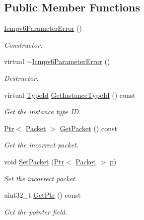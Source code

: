 \subsection*{Public Member Functions}
\begin{DoxyCompactItemize}
\item 
\hyperlink{classns3_1_1Icmpv6ParameterError_acbcfb8ebf705eacc9cbd42bb52dd5c7b}{Icmpv6\+Parameter\+Error} ()
\begin{DoxyCompactList}\small\item\em Constructor. \end{DoxyCompactList}\item 
virtual \hyperlink{classns3_1_1Icmpv6ParameterError_a1a0421a88c9bdf983b4afca69d2f8c9d}{$\sim$\+Icmpv6\+Parameter\+Error} ()
\begin{DoxyCompactList}\small\item\em Destructor. \end{DoxyCompactList}\item 
virtual \hyperlink{classns3_1_1TypeId}{Type\+Id} \hyperlink{classns3_1_1Icmpv6ParameterError_acadc137a5d91d25230ea720481fa442f}{Get\+Instance\+Type\+Id} () const 
\begin{DoxyCompactList}\small\item\em Get the instance type ID. \end{DoxyCompactList}\item 
\hyperlink{classns3_1_1Ptr}{Ptr}$<$ \hyperlink{classns3_1_1Packet}{Packet} $>$ \hyperlink{classns3_1_1Icmpv6ParameterError_af28874993c8eeb684f9987b4d58a7342}{Get\+Packet} () const 
\begin{DoxyCompactList}\small\item\em Get the incorrect packet. \end{DoxyCompactList}\item 
void \hyperlink{classns3_1_1Icmpv6ParameterError_a241ecd7ce904684d5be3f6a60ce4bbde}{Set\+Packet} (\hyperlink{classns3_1_1Ptr}{Ptr}$<$ \hyperlink{classns3_1_1Packet}{Packet} $>$ \hyperlink{lte__link__budget__x2__handover__measures_8m_ac9de518908a968428863f829398a4e62}{p})
\begin{DoxyCompactList}\small\item\em Set the incorrect packet. \end{DoxyCompactList}\item 
uint32\+\_\+t \hyperlink{classns3_1_1Icmpv6ParameterError_a1752f4fc8ef37012e5b29ae61a6e2c65}{Get\+Ptr} () const 
\begin{DoxyCompactList}\small\item\em Get the pointer field. \end{DoxyCompactList}\item 

\end{DoxyCompactItemize}
